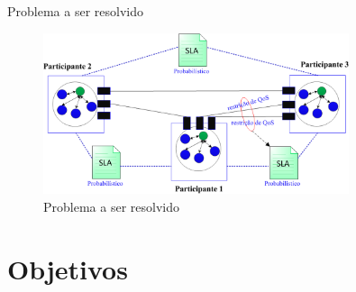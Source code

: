 \documentclass[xcolor=svgnames]{beamer}
\begin{document}
    \begin{frame}{Problema a ser resolvido}
      \begin{figure}[!h]
	  \centering
	  \includegraphics[width=0.8\textwidth]{ChoreographySLAs.png}
	  \caption{Problema a ser resolvido}
      \end{figure}	
    \end{frame}




\section{Objetivos}
\end{document}
